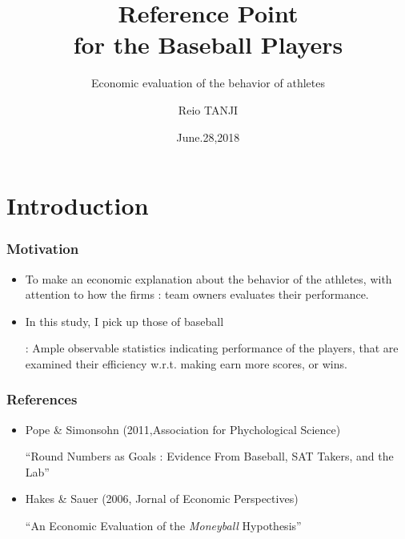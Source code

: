 \documentclass[dvipdfmx,12pt]{beamer}
\title{Reference Point \\ for the Baseball Players}
\subtitle{Economic evaluation of the behavior of athletes}
\author{Reio TANJI}
\date{June.28,2018}
\institute{Osaka University}
\begin{document}
\begin{frame}
\titlepage
\end{frame}

\section{Introduction}
\begin{frame}\frametitle{Motivation}

 \begin{itemize}
 
 \item To make an economic explanation about the behavior of the athletes, with attention to how the firms : team owners evaluates their performance.
 
 \item In this study, I pick up those of baseball
 
 : Ample observable statistics indicating performance of the players, that are examined their efficiency w.r.t. making earn more scores, or wins.
 
 \end{itemize}

\end{frame}

\begin{frame}\frametitle{References}
 
 \begin{itemize}
  
  \item Pope \& Simonsohn (2011,Association for Phychological Science)
   
  ``Round Numbers as Goals : Evidence From Baseball, SAT Takers, and the Lab''
   
  \item Hakes \& Sauer (2006, Jornal of Economic Perspectives)
   
  ``An Economic Evaluation of the \textit{Moneyball} Hypothesis''
   
  \end{itemize}
 
\end{frame}
\end{document}
